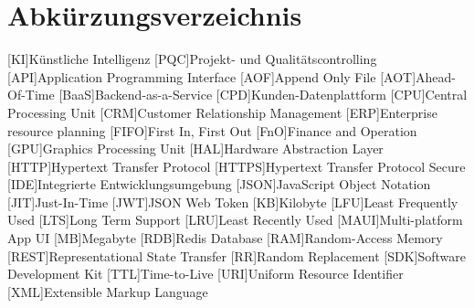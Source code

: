 \newpage
\section*{Abkürzungsverzeichnis}

\begin{acronym}[HTTPS]
    [KI]{Künstliche Intelligenz}
    [PQC]{Projekt- und Qualitätscontrolling}
    [API]{Application Programming Interface}
    [AOF]{Append Only File}
    [AOT]{Ahead-Of-Time}
    [BaaS]{Backend-as-a-Service}
    [CPD]{Kunden-Datenplattform}
    [CPU]{Central Processing Unit}
    [CRM]{Customer Relationship Management}
    [ERP]{Enterprise resource planning}
    [FIFO]{First In, First Out}
    [FnO]{Finance and Operation}
    [GPU]{Graphics Processing Unit}
    [HAL]{Hardware Abstraction Layer}
    [HTTP]{Hypertext Transfer Protocol}
    [HTTPS]{Hypertext Transfer Protocol Secure}
    [IDE]{Integrierte Entwicklungsumgebung}
    [JSON]{JavaScript Object Notation}
    [JIT]{Just-In-Time}
    [JWT]{JSON Web Token}
    [KB]{Kilobyte}
    [LFU]{Least Frequently Used}
    [LTS]{Long Term Support}
    [LRU]{Least Recently Used}
    [MAUI]{Multi-platform App UI}
    [MB]{Megabyte}
    [RDB]{Redis Database}
    [RAM]{Random-Access Memory}
    [REST]{Representational State Transfer}
    [RR]{Random Replacement}
    [SDK]{Software Development Kit}
    [TTL]{Time-to-Live}
    [URI]{Uniform Resource Identifier}
    [XML]{Extensible Markup Language}
\end{acronym}
